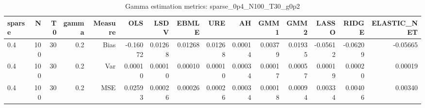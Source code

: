 \begin{table}[!htbp]\centering
\caption{Gamma estimation metrics: sparse_0p4_N100_T30_g0p2}
\label{tab:table1_sparse_0p4_N100_T30_g0p2}
\begin{tabular}{lrrrrrrrrrrrrrr}
\hline
sparse & N & T0 & gamma & Measure & OLS & LSDV & EBMLE & URE & AH & GMM1 & GMM2 & LASSO & RIDGE & ELASTIC_NET \\
\hline
0.4 & 100 & 30 & 0.2 & Bias & -0.16072 & 0.01268 & 0.01268 & 0.01268 & 0.00014 & 0.00379 & 0.01935 & -0.05612 & -0.06209 & -0.05665 \\
0.4 & 100 & 30 & 0.2 & Var & 0.00010 & 0.00010 & 0.00010 & 0.00010 & 0.00034 & 0.00017 & 0.00057 & 0.00019 & 0.00020 & 0.00019 \\
0.4 & 100 & 30 & 0.2 & MSE & 0.02593 & 0.00026 & 0.00026 & 0.00026 & 0.00034 & 0.00018 & 0.00094 & 0.00334 & 0.00406 & 0.00340 \\
\hline
\end{tabular}
\end{table}

